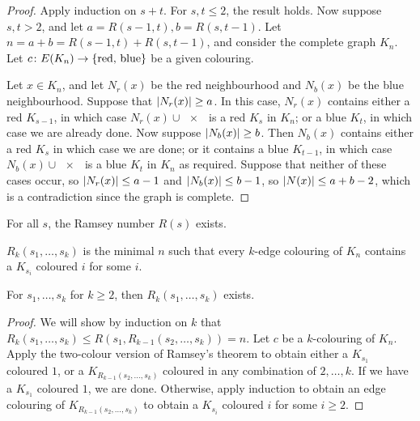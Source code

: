 \begin{proof}
	Apply induction on \( s + t \).
	For \( s, t \leq 2 \), the result holds.
	Now suppose \( s, t > 2 \), and let \( a = R(s-1,t), b = R(s,t-1) \).
	Let \( n = a + b = R(s-1,t) + R(s,t-1) \), and consider the complete graph \( K_n \).
	Let \( c \colon E(K_n) \to \qty{\text{red, blue}} \) be a given colouring.

	Let \( x \in K_n \), and let \( N_r(x) \) be the red neighbourhood and \( N_b(x) \) be the blue neighbourhood.
	Suppose that \( \abs{N_r(x)} \geq a \).
	In this case, \( N_r(x) \) contains either a red \( K_{s-1} \), in which case \( N_r(x) \cup \qty{x} \) is a red \( K_s \) in \( K_n \); or a blue \( K_t \), in which case we are already done.
	Now suppose \( \abs{N_b(x)} \geq b \).
	Then \( N_b(x) \) contains either a red \( K_s \) in which case we are done; or it contains a blue \( K_{t-1} \), in which case \( N_b(x) \cup \qty{x} \) is a blue \( K_t \) in \( K_n \) as required.
	Suppose that neither of these cases occur, so \( \abs{N_r(x)} \leq a - 1 \) and \( \abs{N_b(x)} \leq b - 1 \), so \( \abs{N(x)} \leq a + b - 2 \), which is a contradiction since the graph is complete.
\end{proof}
\begin{corollary}
	For all \( s \), the Ramsey number \( R(s) \) exists.
\end{corollary}
\begin{definition}
	\( R_k(s_1, \dots, s_k) \) is the minimal \( n \) such that every \( k \)-edge colouring of \( K_n \) contains a \( K_{s_i} \) coloured \( i \) for some \( i \).
\end{definition}
\begin{theorem}
	For \( s_1, \dots, s_k \) for \( k \geq 2 \), then \( R_k(s_1, \dots, s_k) \) exists.
\end{theorem}
\begin{proof}
	We will show by induction on \( k \) that \( R_k(s_1, \dots, s_k) \leq R(s_1, R_{k-1}(s_2, \dots, s_k)) = n \).
	Let \( c \) be a \( k \)-colouring of \( K_n \).
	Apply the two-colour version of Ramsey's theorem to obtain either a \( K_{s_1} \) coloured \( 1 \), or a \( K_{R_{k-1}(s_2, \dots, s_k)} \) coloured in any combination of \( 2, \dots, k \).
	If we have a \( K_{s_1} \) coloured \( 1 \), we are done.
	Otherwise, apply induction to obtain an edge colouring of \( K_{R_{k-1}(s_2, \dots, s_k)} \) to obtain a \( K_{s_i} \) coloured \( i \) for some \( i \geq 2 \).
\end{proof}

